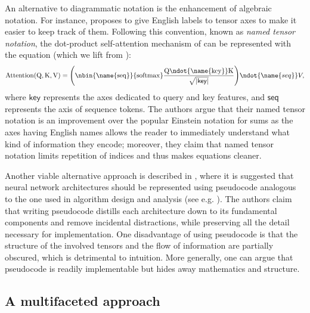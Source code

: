 \documentclass[11pt,a4paper,openright,twoside]{report}
\theoremstyle{plain}
\theoremstyle{definition}
\begin{document}
An alternative to diagrammatic notation is the enhancement of algebraic notation. For instance, \cite{chiang2021named} proposes to give English labels to tensor axes to make it easier to keep track of them. Following this convention, known as \textit{named tensor notation}, the dot-product self-attention mechanism of \cite{vaswani2017attention} can be represented with the equation (which we lift from \cite{chiang2021named}):
\begin{equation}
  \label{eq: attention}
  \mathrm{Attention(Q,K,V) = \left(\nbin{\name{seq}}{\mathrm{softmax}}\frac{Q \ndot{\name{key}} K}{\sqrt{|\mathsf{key}|}}\right)} \ndot{\name{seq}} V,
\end{equation}
where $\mathsf{key}$ represents the axes dedicated to query and key features, and $\mathsf{seq}$ represents the axis of sequence tokens. The authors argue that their named tensor notation is an improvement over the popular Einstein notation for sums as the axes having English names allows the reader to immediately understand what kind of information they encode; moreover, they claim that named tensor notation limits repetition of indices and thus makes equations cleaner.

Another viable alternative approach is described in \cite{phuong2022formal}, where it is suggested that neural network architectures should be represented using pseudocode analogous to the one used in algorithm design and analysis (see e.g. \cite{cormen2022introduction}). The authors claim that writing pseudocode distills each architecture down to its fundamental components and remove incidental distractions, while preserving all the detail necessary for implementation. One disadvantage of using pseudocode is that the structure of the involved tensors and the flow of information are partially obscured, which is detrimental to intuition. More generally, one can argue that pseudocode is readily implementable but hides away mathematics and structure.


\subsection{A multifaceted approach}
\end{document}
